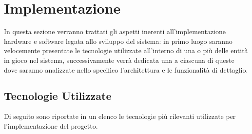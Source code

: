 \section{Implementazione}\label{sec:implementazione}

In questa sezione verranno trattati gli aspetti inerenti all'implementazione hardware e software legata allo sviluppo del sistema:
in primo luogo saranno velocemente presentate le tecnologie utilizzate all'interno di una o più delle entità in gioco nel sistema,
successivamente verrà dedicata una  a ciascuna di queste dove saranno analizzate nello specifico l'architettura e le funzionalità di dettaglio.

\subsection{Tecnologie Utilizzate}

Di seguito sono riportate in un elenco le tecnologie più rilevanti utilizzate per l'implementazione del progetto.

